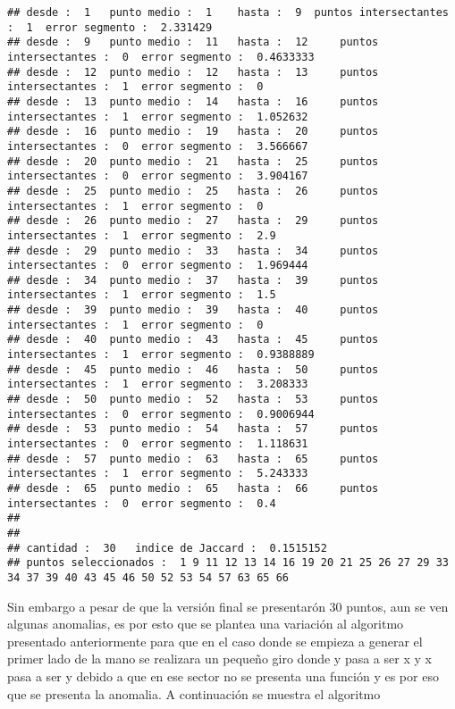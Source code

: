 \documentclass[]{article}
\begin{document}
\begin{verbatim}
## desde :  1   punto medio :  1    hasta :  9  puntos intersectantes :  1  error segmento :  2.331429 
## desde :  9   punto medio :  11   hasta :  12     puntos intersectantes :  0  error segmento :  0.4633333 
## desde :  12  punto medio :  12   hasta :  13     puntos intersectantes :  1  error segmento :  0 
## desde :  13  punto medio :  14   hasta :  16     puntos intersectantes :  1  error segmento :  1.052632 
## desde :  16  punto medio :  19   hasta :  20     puntos intersectantes :  0  error segmento :  3.566667 
## desde :  20  punto medio :  21   hasta :  25     puntos intersectantes :  0  error segmento :  3.904167 
## desde :  25  punto medio :  25   hasta :  26     puntos intersectantes :  1  error segmento :  0 
## desde :  26  punto medio :  27   hasta :  29     puntos intersectantes :  1  error segmento :  2.9 
## desde :  29  punto medio :  33   hasta :  34     puntos intersectantes :  0  error segmento :  1.969444 
## desde :  34  punto medio :  37   hasta :  39     puntos intersectantes :  1  error segmento :  1.5 
## desde :  39  punto medio :  39   hasta :  40     puntos intersectantes :  1  error segmento :  0 
## desde :  40  punto medio :  43   hasta :  45     puntos intersectantes :  1  error segmento :  0.9388889 
## desde :  45  punto medio :  46   hasta :  50     puntos intersectantes :  1  error segmento :  3.208333 
## desde :  50  punto medio :  52   hasta :  53     puntos intersectantes :  0  error segmento :  0.9006944 
## desde :  53  punto medio :  54   hasta :  57     puntos intersectantes :  0  error segmento :  1.118631 
## desde :  57  punto medio :  63   hasta :  65     puntos intersectantes :  1  error segmento :  5.243333 
## desde :  65  punto medio :  65   hasta :  66     puntos intersectantes :  0  error segmento :  0.4 
## 
## 
## cantidad :  30   indice de Jaccard :  0.1515152 
## puntos seleccionados :  1 9 11 12 13 14 16 19 20 21 25 26 27 29 33 34 37 39 40 43 45 46 50 52 53 54 57 63 65 66
\end{verbatim}

Sin embargo a pesar de que la versión final se presentarón 30 puntos,
aun se ven algunas anomalias, es por esto que se plantea una variación
al algoritmo presentado anteriormente para que en el caso donde se
empieza a generar el primer lado de la mano se realizara un pequeño giro
donde y pasa a ser x y x pasa a ser y debido a que en ese sector no se
presenta una función y es por eso que se presenta la anomalia. A
continuación se muestra el algoritmo
\end{document}

